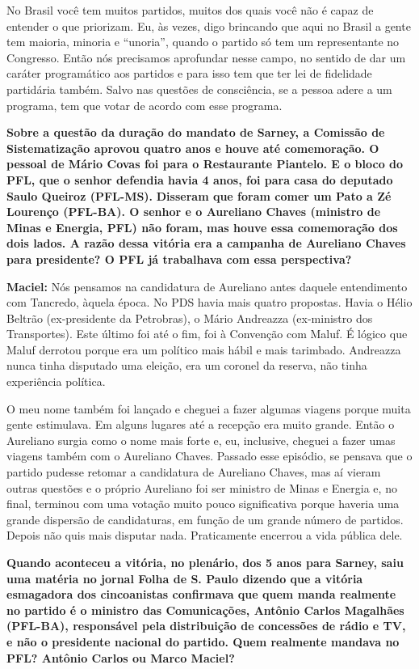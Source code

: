 No Brasil você tem muitos partidos, muitos dos quais você não é capaz de
entender o que priorizam. Eu, às vezes, digo brincando que aqui no
Brasil a gente tem maioria, minoria e ``unoria'', quando o partido só
tem um representante no Congresso. Então nós precisamos aprofundar nesse
campo, no sentido de dar um caráter programático aos partidos e para
isso tem que ter lei de fidelidade partidária também. Salvo nas questões
de consciência, se a pessoa adere a um programa, tem que votar de acordo
com esse programa.

\textbf{Sobre a questão da duração do mandato de Sarney, a Comissão de
Sistematização aprovou quatro anos e houve até comemoração. O pessoal de
Mário Covas foi para o Restaurante Piantelo. E o bloco do PFL, que o
senhor defendia havia 4 anos, foi para casa do deputado Saulo Queiroz
(PFL-MS).} \textbf{Disseram que foram comer um Pato a Zé Lourenço
(PFL-BA). O senhor e o Aureliano Chaves (ministro de Minas e Energia,
PFL) não foram, mas houve essa comemoração dos dois lados. A razão dessa
vitória era a campanha de Aureliano Chaves para presidente? O PFL já
trabalhava com essa perspectiva?}

\textbf{Maciel:} Nós pensamos na candidatura de Aureliano antes daquele
entendimento com Tancredo, àquela época. No PDS havia mais quatro
propostas. Havia o Hélio Beltrão (ex-presidente da Petrobras), o Mário
Andreazza (ex-ministro dos Transportes). Este último foi até o fim, foi
à Convenção com Maluf. É lógico que Maluf derrotou porque era um
político mais hábil e mais tarimbado. Andreazza nunca tinha disputado
uma eleição, era um coronel da reserva, não tinha experiência política.

O meu nome também foi lançado e cheguei a fazer algumas viagens porque
muita gente estimulava. Em alguns lugares até a recepção era muito
grande. Então o Aureliano surgia como o nome mais forte e, eu,
inclusive, cheguei a fazer umas viagens também com o Aureliano Chaves.
Passado esse episódio, se pensava que o partido pudesse retomar a
candidatura de Aureliano Chaves, mas aí vieram outras questões e o
próprio Aureliano foi ser ministro de Minas e Energia e, no final,
terminou com uma votação muito pouco significativa porque haveria uma
grande dispersão de candidaturas, em função de um grande número de
partidos. Depois não quis mais disputar nada. Praticamente encerrou a
vida pública dele.

\textbf{Quando aconteceu a vitória, no plenário, dos 5 anos para Sarney,
saiu uma matéria no jornal Folha de S. Paulo dizendo que a vitória
esmagadora dos cincoanistas confirmava que quem manda realmente no
partido é o ministro das Comunicações, Antônio Carlos Magalhães
(PFL-BA), responsável pela distribuição de concessões de rádio e TV, e
não o presidente nacional do partido. Quem realmente mandava no PFL?
Antônio Carlos ou Marco Maciel? }

